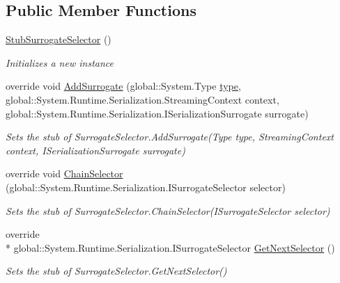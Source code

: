 \subsection*{Public Member Functions}
\begin{DoxyCompactItemize}
\item 
\hyperlink{class_system_1_1_runtime_1_1_serialization_1_1_fakes_1_1_stub_surrogate_selector_aa8c3001b53b51714e17c42320b98c4be}{Stub\-Surrogate\-Selector} ()
\begin{DoxyCompactList}\small\item\em Initializes a new instance\end{DoxyCompactList}\item 
override void \hyperlink{class_system_1_1_runtime_1_1_serialization_1_1_fakes_1_1_stub_surrogate_selector_a6356ab6c76d8eafab1f115af662e5f81}{Add\-Surrogate} (global\-::\-System.\-Type \hyperlink{jquery-1_810_82-vsdoc_8js_a3940565e83a9bfd10d95ffd27536da91}{type}, global\-::\-System.\-Runtime.\-Serialization.\-Streaming\-Context context, global\-::\-System.\-Runtime.\-Serialization.\-I\-Serialization\-Surrogate surrogate)
\begin{DoxyCompactList}\small\item\em Sets the stub of Surrogate\-Selector.\-Add\-Surrogate(\-Type type, Streaming\-Context context, I\-Serialization\-Surrogate surrogate)\end{DoxyCompactList}\item 
override void \hyperlink{class_system_1_1_runtime_1_1_serialization_1_1_fakes_1_1_stub_surrogate_selector_a301e4617ef49e3304be66f592f7c23e6}{Chain\-Selector} (global\-::\-System.\-Runtime.\-Serialization.\-I\-Surrogate\-Selector selector)
\begin{DoxyCompactList}\small\item\em Sets the stub of Surrogate\-Selector.\-Chain\-Selector(\-I\-Surrogate\-Selector selector)\end{DoxyCompactList}\item 
override \\*
global\-::\-System.\-Runtime.\-Serialization.\-I\-Surrogate\-Selector \hyperlink{class_system_1_1_runtime_1_1_serialization_1_1_fakes_1_1_stub_surrogate_selector_ae2001c71461a9175ac27b640c62622a4}{Get\-Next\-Selector} ()
\begin{DoxyCompactList}\small\item\em Sets the stub of Surrogate\-Selector.\-Get\-Next\-Selector()\end{DoxyCompactList}\item 

\end{DoxyCompactItemize}
